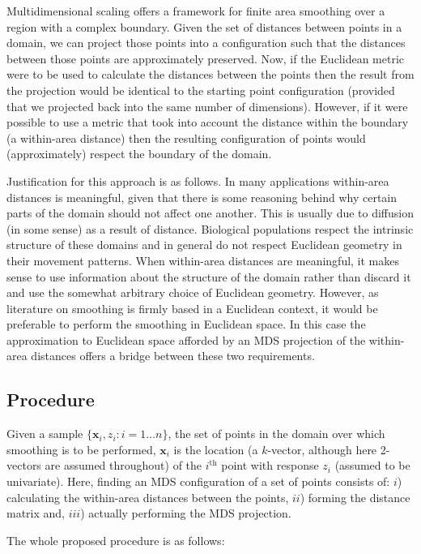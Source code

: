 Multidimensional scaling offers a framework for finite area smoothing over a region with a complex boundary. Given the set of distances between points in a domain, we can project those points into a configuration such that the distances between those points are approximately preserved. Now, if the Euclidean metric were to be used to calculate the distances between the points then the result from the projection would be identical to the starting point configuration (provided that we projected back into the same number of dimensions). However, if it were possible to use a metric that took into account the distance within the boundary (a within-area distance) then the resulting configuration of points would (approximately) respect the boundary of the domain.

Justification for this approach is as follows. In many applications within-area distances is meaningful, given that there is some reasoning behind why certain parts of the domain should not affect one another. This is usually due to diffusion (in some sense) as a result of distance. Biological populations respect the intrinsic structure of these domains and in general do not respect Euclidean geometry in their movement patterns. When within-area distances are meaningful, it makes sense to use information about the structure of the domain rather than discard it and use the somewhat arbitrary choice of Euclidean geometry. However, as literature on smoothing is firmly based in a Euclidean context, it would be preferable to perform the smoothing in Euclidean space. In this case the approximation to Euclidean space afforded by an MDS projection of the within-area distances offers a bridge between these two requirements.

\subsection{Procedure}
\label{mdsproc}
Given a sample $\{\mathbf{x}_i, z_i : i=1\dots n\}$, the set of points in the domain over which smoothing is to be performed, $\mathbf{x}_i$ is the location (a $k$-vector, although here 2-vectors are assumed throughout) of the $i^\text{th}$ point with response $z_i$ (assumed to be univariate). Here, finding an MDS configuration of a set of points consists of: $i$) calculating the within-area distances between the points, $ii$) forming the distance matrix and, $iii$) actually performing the MDS projection.

The whole proposed procedure is as follows:

